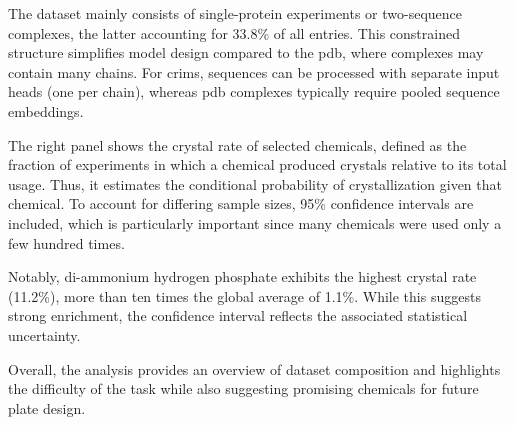The dataset mainly consists of single-protein experiments or two-sequence complexes, the latter accounting for 33.8\% of all entries. This constrained structure simplifies model design compared to the \gls{pdb}, where complexes may contain many chains. For \gls{crims}, sequences can be processed with separate input heads (one per chain), whereas \gls{pdb} complexes typically require pooled sequence embeddings.

The right panel shows the crystal rate of selected chemicals, defined as the fraction of experiments in which a chemical produced crystals relative to its total usage. Thus, it estimates the conditional probability of crystallization given that chemical. To account for differing sample sizes, 95\% confidence intervals are included, which is particularly important since many chemicals were used only a few hundred times.

Notably, di-ammonium hydrogen phosphate exhibits the highest crystal rate (11.2\%), more than ten times the global average of 1.1\%. While this suggests strong enrichment, the confidence interval reflects the associated statistical uncertainty.

Overall, the analysis provides an overview of dataset composition and highlights the difficulty of the task while also suggesting promising chemicals for future plate design.
